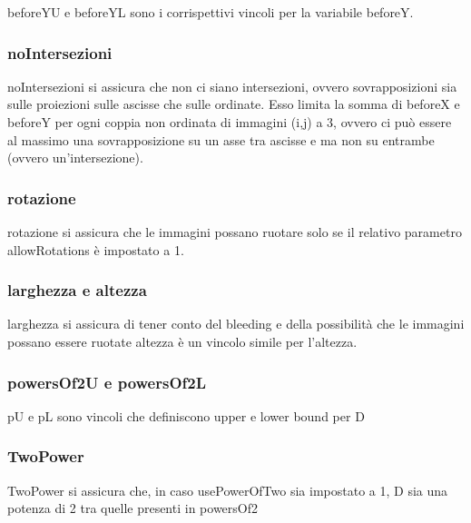 beforeYU e beforeYL sono i corrispettivi vincoli per la variabile beforeY.


\subsubsection{noIntersezioni}
noIntersezioni si assicura che non ci siano intersezioni, ovvero sovrapposizioni sia sulle proiezioni sulle ascisse che sulle ordinate. Esso limita la somma di beforeX e beforeY per ogni coppia non ordinata di immagini (i,j) a 3, ovvero ci può essere al massimo una sovrapposizione su un asse tra ascisse e ma non su entrambe (ovvero un'intersezione).



\subsubsection{rotazione}
rotazione si assicura che le immagini possano ruotare solo se il relativo parametro allowRotations è impostato a 1.





\subsubsection{larghezza e altezza}
larghezza si assicura di tener conto del bleeding e della possibilità che le immagini possano essere ruotate
altezza è un vincolo simile per l'altezza. \\


\subsubsection{powersOf2U e powersOf2L}
pU e pL sono vincoli che definiscono upper e lower bound per D

\subsubsection{TwoPower}
TwoPower si assicura che, in caso usePowerOfTwo sia impostato a 1, D sia una potenza di 2 tra quelle presenti in powersOf2 



